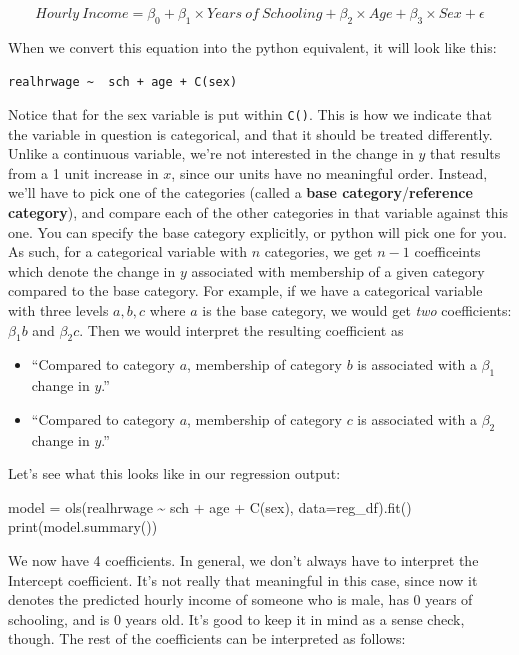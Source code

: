 \documentclass[
  letterpaper,
  DIV=11,
  numbers=noendperiod]{scrreprt}
\newenvironment{Shaded}{\begin{snugshade}}{\end{snugshade}}
\newcommand{\BuiltInTok}[1]{\textcolor[rgb]{0.00,0.23,0.31}{#1}}
\newcommand{\NormalTok}[1]{\textcolor[rgb]{0.00,0.23,0.31}{#1}}
\newcommand{\OperatorTok}[1]{\textcolor[rgb]{0.37,0.37,0.37}{#1}}
\newcommand{\StringTok}[1]{\textcolor[rgb]{0.13,0.47,0.30}{#1}}
\providecommand{\tightlist}{%
  \setlength{\itemsep}{0pt}\setlength{\parskip}{0pt}}\usepackage{longtable,booktabs,array}
\begin{document}
\[Hourly\ Income= \beta_0 + \beta_1 \times Years\ of\ Schooling + \beta_2 \times Age + \beta_3 \times Sex +\epsilon \]

When we convert this equation into the python equivalent, it will look
like this:

\texttt{realhrwage\ \textasciitilde{}\ \ sch\ +\ age\ +\ C(sex)}

Notice that for the sex variable is put within \texttt{C()}. This is how
we indicate that the variable in question is categorical, and that it
should be treated differently. Unlike a continuous variable, we're not
interested in the change in \(y\) that results from a 1 unit increase in
\(x\), since our units have no meaningful order. Instead, we'll have to
pick one of the categories (called a \textbf{base
category}/\textbf{reference category}), and compare each of the other
categories in that variable against this one. You can specify the base
category explicitly, or python will pick one for you. As such, for a
categorical variable with \(n\) categories, we get \(n-1\) coefficeints
which denote the change in \(y\) associated with membership of a given
category compared to the base category. For example, if we have a
categorical variable with three levels \(a, b, c\) where \(a\) is the
base category, we would get \emph{two} coefficients: \(\beta_1 b\) and
\(\beta_2 c\). Then we would interpret the resulting coefficient as

\begin{itemize}
\tightlist
\item
  ``Compared to category \(a\), membership of category \(b\) is
  associated with a \(\beta_1\) change in \(y\).''
\item
  ``Compared to category \(a\), membership of category \(c\) is
  associated with a \(\beta_2\) change in \(y\).''
\end{itemize}

Let's see what this looks like in our regression output:

\begin{Shaded}
\begin{Highlighting}[]
\NormalTok{model }\OperatorTok{=}\NormalTok{ ols(}\StringTok{\textquotesingle{}realhrwage \textasciitilde{}  sch + age + C(sex)\textquotesingle{}}\NormalTok{, data}\OperatorTok{=}\NormalTok{reg\_df).fit() }
\BuiltInTok{print}\NormalTok{(model.summary())}
\end{Highlighting}
\end{Shaded}

We now have 4 coefficients. In general, we don't always have to
interpret the Intercept coefficient. It's not really that meaningful in
this case, since now it denotes the predicted hourly income of someone
who is male, has 0 years of schooling, and is 0 years old. It's good to
keep it in mind as a sense check, though. The rest of the coefficients
can be interpreted as follows:
\end{document}
